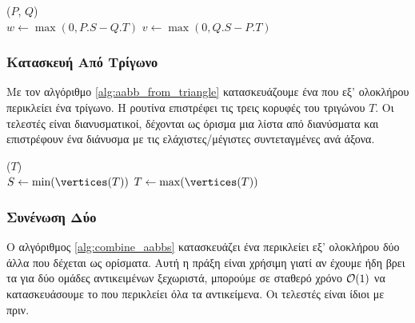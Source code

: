 \IncMargin{1.5em}
\begin{algorithm}[H]
    \label{alg:aabb_dist}
    \caption[Υπολογισμός Απόστασης δύο ]{
    }
    \DontPrintSemicolon
    \Indm\nonl\funcname($P$, $Q$)\\
    \Indp
        $w \gets \max(0, P.S - Q.T)$\;
        $v \gets \max(0, Q.S - P.T)$\;

    
\end{algorithm}
\DecMargin{1.5em}

\subsubsection{Κατασκευή  Από Τρίγωνο}
Με τον αλγόριθμο \ref{alg:aabb_from_triangle} κατασκευάζουμε 
ένα  που εξ' ολοκλήρου περικλείει ένα τρίγωνο.
Η ρουτίνα  επιστρέφει τις 
τρεις κορυφές του τριγώνου $T$.
Οι τελεστές  είναι διανυσματικοί,
δέχονται ως όρισμα μια λίστα από διανύσματα και επιστρέφουν 
ένα διάνυσμα με τις ελάχιστες/μέγιστες συντεταγμένες ανά άξονα.

\IncMargin{1.5em}
\begin{algorithm}[H]
    \label{alg:aabb_from_triangle}
    \caption[Κατασκευή  από Τρίγωνο]{
        }
    \DontPrintSemicolon
    \Indm\nonl\funcname($T$)\\
    \Indp
        $S \gets \min(\vertices(T))$\;
        $T \gets \max(\vertices(T))$\; 
    
\end{algorithm}
\DecMargin{1.5em}

\subsubsection{Συνένωση Δύο }
Ο αλγόριθμος \ref{alg:combine_aabbs} κατασκευάζει ένα  περικλείει
εξ' ολοκλήρου δύο άλλα  που δέχεται ως ορίσματα. 
Αυτή η πράξη είναι χρήσιμη γιατί αν έχουμε ήδη βρει τα  για δύο 
ομάδες αντικειμένων ξεχωριστά, μπορούμε σε σταθερό χρόνο $\mathcal{O}(1)$ να 
κατασκευάσουμε το  που περικλείει όλα τα αντικείμενα. 
Οι τελεστές  είναι ίδιοι με πριν.

